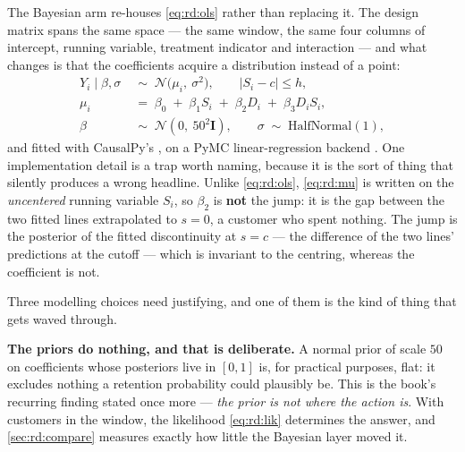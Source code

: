 The Bayesian arm re-houses \cref{eq:rd:ols} rather than replacing it. The design matrix spans the
same space --- the same window, the same four columns of intercept, running variable, treatment
indicator and interaction --- and what changes is that the coefficients acquire a distribution
instead of a point:
%
\begin{align}
  Y_i \mid \beta, \sigma
    &\;\sim\; \mathcal N\!\big(\mu_i,\ \sigma^{2}\big),
    \qquad |S_i - c| \le h, \label{eq:rd:lik}\\
  \mu_i &\;=\; \beta_0 \;+\; \beta_1 S_i \;+\; \beta_2 D_i \;+\; \beta_3 D_i S_i ,
    \label{eq:rd:mu}\\
  \beta &\;\sim\; \mathcal N(0,\ 50^2 \mathbf I), \qquad \sigma \;\sim\; \text{HalfNormal}(1),
    \label{eq:rd:prior}
\end{align}
%
and fitted with CausalPy's , on a PyMC linear-regression
backend \citep{salvatier2016}. One implementation detail is a trap worth naming, because it is the
sort of thing that silently produces a wrong headline. Unlike \cref{eq:rd:ols}, \cref{eq:rd:mu} is
written on the \emph{uncentered} running variable $S_i$, so $\beta_2$ is \textbf{not} the jump: it
is the gap between the two fitted lines extrapolated to $s = 0$, a customer who spent nothing. The
jump is the posterior of the fitted discontinuity at $s = c$ --- the difference of the two lines'
predictions at the cutoff --- which is invariant to the centring, whereas the coefficient is not.

Three modelling choices need justifying, and one of them is the kind of thing that gets waved
through.

\textbf{The priors do nothing, and that is deliberate.} A normal prior of scale $50$ on
coefficients whose posteriors live in $[0, 1]$ is, for practical purposes, flat: it excludes nothing
a retention probability could plausibly be. This is the book's recurring finding stated once more
--- \emph{the prior is not where the action is}. With \nbNineNWindow{} customers in the window, the
likelihood \cref{eq:rd:lik} determines the answer, and \cref{sec:rd:compare} measures exactly how
little the Bayesian layer moved it.

